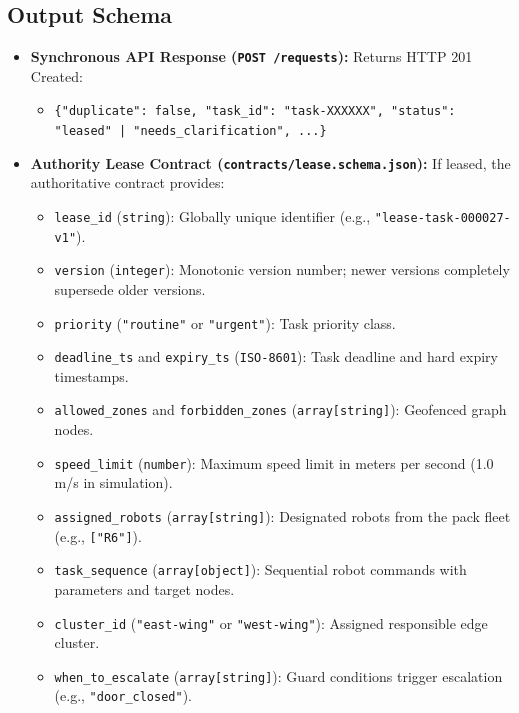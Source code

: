 \documentclass[10pt,letterpaper]{article}
\begin{document}
\subsection{Output Schema}
\begin{itemize}
  \item \textbf{Synchronous API Response (\texttt{POST /requests}):} Returns HTTP 201 Created:
  \begin{itemize}
    \item \texttt{\{"duplicate": false, "task\_id": "task-XXXXXX", "status": "leased" | "needs\_clarification", ...\}}
  \end{itemize}
  \item \textbf{Authority Lease Contract (\texttt{contracts/lease.schema.json}):} If leased, the authoritative contract provides:
  \begin{itemize}
    \item \texttt{lease\_id} (\texttt{string}): Globally unique identifier (e.g., \texttt{"lease-task-000027-v1"}).
    \item \texttt{version} (\texttt{integer}): Monotonic version number; newer versions completely supersede older versions.
    \item \texttt{priority} (\texttt{"routine"} or \texttt{"urgent"}): Task priority class.
    \item \texttt{deadline\_ts} and \texttt{expiry\_ts} (\texttt{ISO-8601}): Task deadline and hard expiry timestamps.
    \item \texttt{allowed\_zones} and \texttt{forbidden\_zones} (\texttt{array[string]}): Geofenced graph nodes.
    \item \texttt{speed\_limit} (\texttt{number}): Maximum speed limit in meters per second (1.0 m/s in simulation).
    \item \texttt{assigned\_robots} (\texttt{array[string]}): Designated robots from the pack fleet (e.g., \texttt{["R6"]}).
    \item \texttt{task\_sequence} (\texttt{array[object]}): Sequential robot commands with parameters and target nodes.
    \item \texttt{cluster\_id} (\texttt{"east-wing"} or \texttt{"west-wing"}): Assigned responsible edge cluster.
    \item \texttt{when\_to\_escalate} (\texttt{array[string]}): Guard conditions trigger escalation (e.g., \texttt{"door\_closed"}).
  \end{itemize}
\end{itemize}
\end{document}
